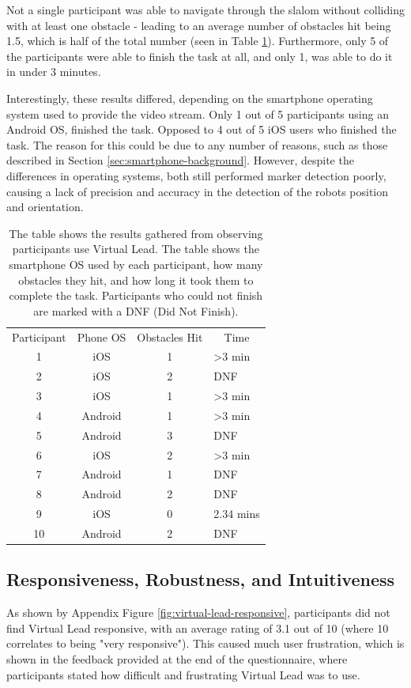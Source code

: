 \documentclass{l4proj}
\begin{document}
Not a single participant was able to navigate through the slalom without colliding with at least one obstacle - leading to an average number of obstacles hit being 1.5, which is half of the total number (seen in Table \ref{tab:virtual-lead-times}). Furthermore, only 5 of the participants were able to finish the task at all, and only 1, was able to do it in under 3 minutes.

Interestingly, these results differed, depending on the smartphone operating system used to provide the video stream. Only 1 out of 5 participants using an Android OS, finished the task. Opposed to 4 out of 5 iOS users who finished the task. The reason for this could be due to any number of reasons, such as those described in Section \ref{sec:smartphone-background}.  However, despite the differences in operating systems, both still performed marker detection poorly, causing a lack of precision and accuracy in the detection of the robots position and orientation.

\begin{table}[]
\centering
\caption{The table shows the results gathered from observing participants use Virtual Lead. The table shows the smartphone OS used by each participant, how many obstacles they hit, and how long it took them to complete the task. Participants who could not finish are marked with a DNF (Did Not Finish).}
\label{tab:virtual-lead-times}
\begin{tabular}{cccl}
Participant & Phone OS & Obstacles Hit & \multicolumn{1}{c}{Time} \\
1 & iOS & 1 & \textgreater{}3 min \\
2 & iOS & 2 & DNF \\
3 & iOS & 1 & \textgreater{}3 min \\
4 & Android & 1 & \textgreater{}3 min \\
5 & Android & 3 & DNF \\
6 & iOS & 2 & \cellcolor[HTML]{FFFFFF}\textgreater{}3 min \\
7 & Android & 1 & DNF \\
8 & Android & 2 & DNF \\
9 & iOS & 0 & 2.34 mins \\
10 & Android & 2 & DNF
\end{tabular}
\end{table}


\subsection{Responsiveness, Robustness, and Intuitiveness}
As shown by Appendix Figure \ref{fig:virtual-lead-responsive}, participants did not find Virtual Lead responsive, with an average rating of 3.1 out of 10 (where 10 correlates to being "very responsive"). This caused much user frustration, which is shown in the feedback provided at the end of the questionnaire, where participants stated how difficult and frustrating Virtual Lead was to use.
\end{document}
